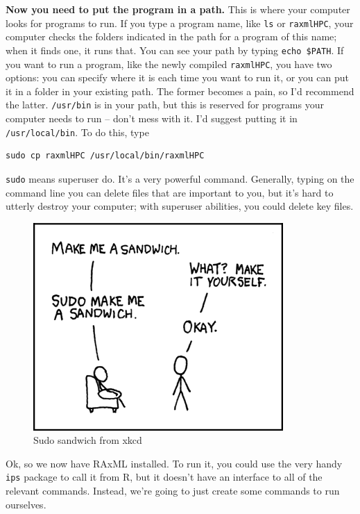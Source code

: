 \documentclass[]{article}
\theoremstyle{definition}
\theoremstyle{definition}
\theoremstyle{definition}
\theoremstyle{remark}
\begin{document}
\textbf{Now you need to put the program in a path.} This is where your
computer looks for programs to run. If you type a program name, like
\texttt{ls} or \texttt{raxmlHPC}, your computer checks the folders
indicated in the path for a program of this name; when it finds one, it
runs that. You can see your path by typing \texttt{echo\ \$PATH}. If you
want to run a program, like the newly compiled \texttt{raxmlHPC}, you
have two options: you can specify where it is each time you want to run
it, or you can put it in a folder in your existing path. The former
becomes a pain, so I'd recommend the latter. \texttt{/usr/bin} is in
your path, but this is reserved for programs your computer needs to run
-- don't mess with it. I'd suggest putting it in
\texttt{/usr/local/bin}. To do this, type

\begin{verbatim}
sudo cp raxmlHPC /usr/local/bin/raxmlHPC
\end{verbatim}

\texttt{sudo} means superuser do. It's a very powerful command.
Generally, typing on the command line you can delete files that are
important to you, but it's hard to utterly destroy your computer; with
superuser abilities, you could delete key files.

\begin{figure}
\centering
\includegraphics{images/sandwich.png}
\caption{Sudo sandwich from xkcd}
\end{figure}

Ok, so we now have RAxML installed. To run it, you could use the very
handy \texttt{ips} package to call it from R, but it doesn't have an
interface to all of the relevant commands. Instead, we're going to just
create some commands to run ourselves.
\end{document}

